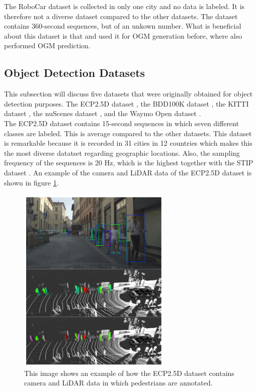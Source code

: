 The RoboCar dataset \cite{robotcardatasetijrr} is collected in only one city and no data is labeled. It is therefore not a diverse dataset compared to the other datasets. The dataset contains 360-second sequences, but of an unkown number. What is beneficial about this dataset is that \cite{dequaire2018deep} and \cite{wang2020l2r} used it for \gls{OGM} generation before, where \cite{dequaire2018deep} also performed \gls{OGM} prediction.


\subsection{Object Detection Datasets} \label{subsec:data_ob_det}
This subsection will discuss five datasets that were originally obtained for object detection purposes. The \gls{ECP2.5D} dataset \cite{braun2020ecp2}, the \gls{BDD100K} dataset \cite{yu2020bdd100k}, the \gls{KITTI} dataset \cite{geiger2012we}, the nuScenes dataset \cite{caesar2020nuscenes}, and the Waymo Open dataset \cite{sun2020scalability}. \\

The \gls{ECP2.5D} dataset \cite{braun2020ecp2} contains 15-second sequences in which seven different classes are labeled. This is average compared to the other datasets. This dataset is remarkable because it is recorded in 31 cities in 12 countries which makes this the most diverse datatset regarding geographic locations. Also, the sampling frequency of the sequences is 20 Hz, which is the highest together with the \gls{STIP} dataset \cite{liu2020spatiotemporal}. An example of the camera and LiDAR data of the \gls{ECP2.5D} dataset \cite{braun2020ecp2} is shown in figure \ref{fig:dat_ecp}. \\

\begin{figure}[h!]
	\centering
	\includegraphics[width=0.4\linewidth]{Figures/Datasets/ECP_Dataset}
	\caption{This image shows an example of how the \gls{ECP2.5D} \cite{braun2020ecp2} dataset contains camera and LiDAR data in which pedestrians are annotated.}  
	\label{fig:dat_ecp}
\end{figure}


